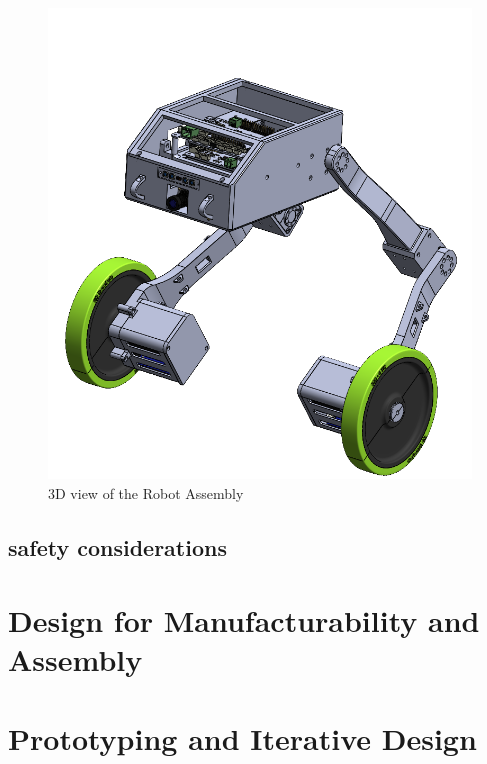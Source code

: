 \begin{figure}[h]
	\centering
	\includegraphics[width=1\linewidth]{Robot_Assembly_3}
	\caption[3D view of the Robot Assembly]{3D view of the Robot Assembly}
	\label{fig:robotassembly3}
\end{figure}
\subsection{safety considerations}





\section{Design for Manufacturability and Assembly}
\section{Prototyping and Iterative Design}


